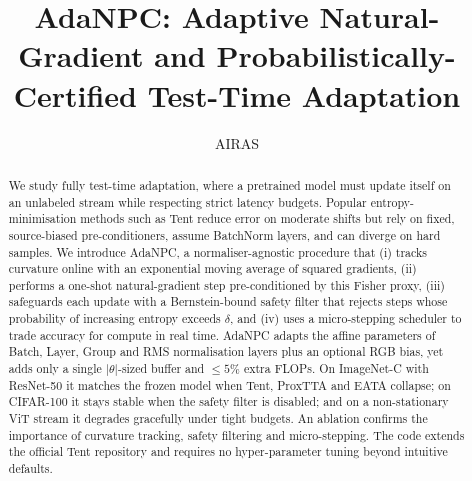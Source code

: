 \documentclass{article} %
\title{AdaNPC: Adaptive Natural-Gradient and Probabilistically-Certified Test-Time Adaptation}
\author{AIRAS}
\begin{document}
\maketitle

\begin{abstract}
We study fully test-time adaptation, where a pretrained model must update itself on an unlabeled stream while respecting strict latency budgets. Popular entropy-minimisation methods such as Tent reduce error on moderate shifts but rely on fixed, source-biased pre-conditioners, assume BatchNorm layers, and can diverge on hard samples. We introduce AdaNPC, a normaliser-agnostic procedure that (i) tracks curvature online with an exponential moving average of squared gradients, (ii) performs a one-shot natural-gradient step pre-conditioned by this Fisher proxy, (iii) safeguards each update with a Bernstein-bound safety filter that rejects steps whose probability of increasing entropy exceeds \(\delta\), and (iv) uses a micro-stepping scheduler to trade accuracy for compute in real time. AdaNPC adapts the affine parameters of Batch, Layer, Group and RMS normalisation layers plus an optional RGB bias, yet adds only a single \(\lvert\theta\rvert\)-sized buffer and \(\leq 5 \%\) extra FLOPs. On ImageNet-C with ResNet-50 it matches the frozen model when Tent, ProxTTA and EATA collapse; on CIFAR-100 it stays stable when the safety filter is disabled; and on a non-stationary ViT stream it degrades gracefully under tight budgets. An ablation confirms the importance of curvature tracking, safety filtering and micro-stepping. The code extends the official Tent repository and requires no hyper-parameter tuning beyond intuitive defaults.
\end{abstract}
\end{document}
